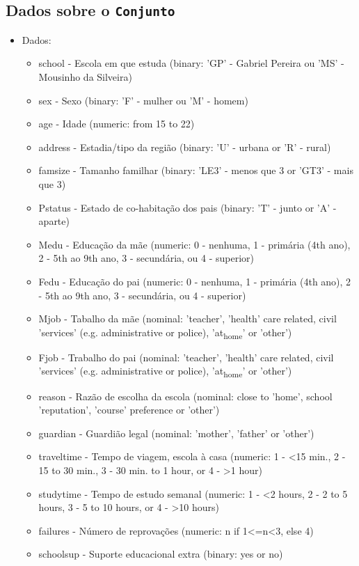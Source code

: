 \documentclass[12pt]{abntex2}
\begin{document}
\subsection{Dados sobre o \texttt{Conjunto}}
\label{sec:orgf4e6b51}
\begin{itemize}
\item Dados:
\begin{itemize}
\item school - Escola em que estuda (binary: 'GP' - Gabriel Pereira ou 'MS' - Mousinho da Silveira)
\item sex - Sexo (binary: 'F' - mulher ou 'M' - homem)
\item age - Idade (numeric: from 15 to 22)
\item address - Estadia/tipo da região (binary: 'U' - urbana or 'R' - rural)
\item famsize - Tamanho familhar (binary: 'LE3' - menos que  3 or 'GT3' - mais que 3)
\item Pstatus - Estado de co-habitação dos pais (binary: 'T' - junto or 'A' - aparte)
\item Medu - Educação da mãe (numeric: 0 - nenhuma, 1 - primária (4th ano), 2 - 5th ao 9th ano, 3 - secundária, ou 4 - superior)
\item Fedu - Educação do pai (numeric: 0 - nenhuma, 1 - primária (4th ano), 2 - 5th ao 9th ano, 3 - secundária, ou 4 - superior)
\item Mjob - Tabalho da mãe (nominal: 'teacher', 'health' care related, civil 'services' (e.g. administrative or police), 'at\textsubscript{home}' or 'other')
\item Fjob - Trabalho do pai (nominal: 'teacher', 'health' care related, civil 'services' (e.g. administrative or police), 'at\textsubscript{home}' or 'other')
\item reason - Razão de escolha da escola (nominal: close to 'home', school 'reputation', 'course' preference or 'other')
\item guardian - Guardião legal (nominal: 'mother', 'father' or 'other')
\item traveltime - Tempo de viagem, escola à casa (numeric: 1 - <15 min., 2 - 15 to 30 min., 3 - 30 min. to 1 hour, or 4 - >1 hour)
\item studytime - Tempo de estudo semanal (numeric: 1 - <2 hours, 2 - 2 to 5 hours, 3 - 5 to 10 hours, or 4 - >10 hours)
\item failures - Número de reprovações (numeric: n if 1<=n<3, else 4)
\item schoolsup - Suporte educacional extra (binary: yes or no)

\end{itemize}
\end{itemize}
\end{document}
